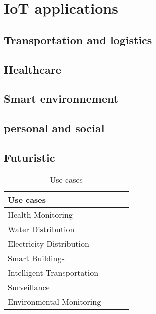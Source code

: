 \section{IoT applications \cite{bregell_hardware_2015}} %
\label{sec:section_name}

\subsection{Transportation and logistics}
\subsection{Healthcare}
\subsection{Smart environnement}
\subsection{personal and social}
\subsection{Futuristic}





\begin{table}[h!]
\scriptsize
	\begin{tabular}{l|l|l|l}
	\textbf{Use cases}         &  &  & \\\hline
	Health Monitoring          &  &  & \\\hline
	Water Distribution         &  &  & \\\hline
	Electricity Distribution   &  &  & \\\hline
	Smart Buildings            &  &  & \\\hline
	Intelligent Transportation &  &  & \\\hline
	Surveillance               &  &  & \\\hline
	Environmental Monitoring   &  &  & \\
	\end{tabular}
	\caption{\label{tab:IoTUseCase} Use cases \cite{hancke_role_2012}}
\end{table}


